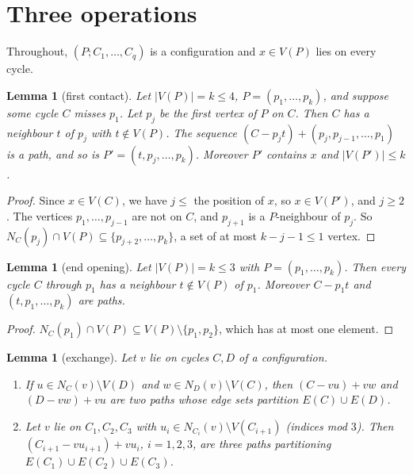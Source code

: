 \documentclass[11pt]{amsart}
\newtheorem{lemma}[theorem]{Lemma}
\theoremstyle{definition}
\theoremstyle{remark}
\begin{document}
\section{Three operations}

Throughout, $(P;C_1,\dots,C_q)$ is a configuration and $x\in V(P)$ lies on every cycle.

\begin{lemma}[first contact]\label{lem:first}
Let $|V(P)|=k\le 4$, $P=(p_1,\dots,p_k)$, and suppose some cycle $C$ misses $p_1$. Let $p_j$ be
the first vertex of $P$ on $C$. Then $C$ has a neighbour $t$ of $p_j$ with
$t\notin V(P)$. The sequence $(C-p_jt)+(p_j,p_{j-1},\dots,p_1)$ is a path, and so is
$P'=(t,p_j,\dots,p_k)$. Moreover $P'$ contains $x$ and $|V(P')|\le k$.
\end{lemma}

\begin{proof}
Since $x\in V(C)$, we have $j\le$ the position of $x$, so $x\in V(P')$, and $j\ge 2$. The vertices
$p_1,\dots,p_{j-1}$ are not on $C$, and $p_{j+1}$ is a $P$-neighbour of $p_j$. So
$N_C(p_j)\cap V(P)\subseteq\{p_{j+2},\dots,p_k\}$, a set of at most $k-j-1\le 1$ vertex.
\end{proof}

\begin{lemma}[end opening]\label{lem:end}
Let $|V(P)|=k\le 3$ with $P=(p_1,\dots,p_k)$. Then every cycle $C$ through $p_1$ has a neighbour
$t\notin V(P)$ of $p_1$. Moreover $C-p_1t$ and $(t,p_1,\dots,p_k)$ are paths.
\end{lemma}

\begin{proof}
$N_C(p_1)\cap V(P)\subseteq V(P)\setminus\{p_1,p_2\}$, which has at most one element.
\end{proof}

\begin{lemma}[exchange]\label{lem:exch}
Let $v$ lie on cycles $C,D$ of a configuration.
\begin{enumerate}[label=(\alph*)]
\item If $u\in N_C(v)\setminus V(D)$ and $w\in N_D(v)\setminus V(C)$, then $(C-vu)+vw$ and
$(D-vw)+vu$ are two paths whose edge sets partition $E(C)\cup E(D)$.
\item Let $v$ lie on $C_1,C_2,C_3$ with $u_i\in N_{C_i}(v)\setminus V(C_{i+1})$ (indices mod $3$).
Then $(C_{i+1}-vu_{i+1})+vu_i$, $i=1,2,3$, are three paths partitioning
$E(C_1)\cup E(C_2)\cup E(C_3)$.
\end{enumerate}
\end{lemma}
\end{document}
